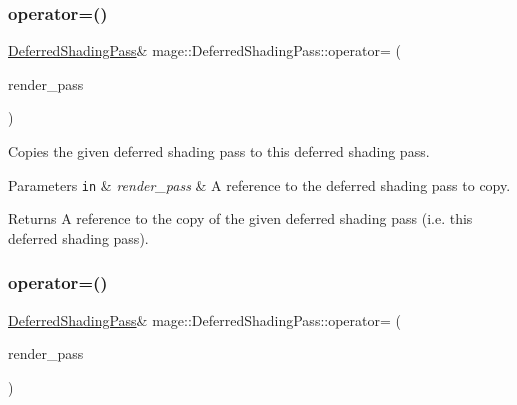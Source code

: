 \subsubsection{\texorpdfstring{operator=()}{operator=()}\hspace{0.1cm}{\footnotesize\ttfamily [1/2]}}
{\footnotesize\ttfamily \hyperlink{classmage_1_1_deferred_shading_pass}{Deferred\+Shading\+Pass}\& mage\+::\+Deferred\+Shading\+Pass\+::operator= (\begin{DoxyParamCaption}\item[{const \hyperlink{classmage_1_1_deferred_shading_pass}{Deferred\+Shading\+Pass} \&}]{render\+\_\+pass }\end{DoxyParamCaption})\hspace{0.3cm}{\ttfamily [delete]}}

Copies the given deferred shading pass to this deferred shading pass.


\begin{DoxyParams}[1]{Parameters}
\mbox{\tt in}  & {\em render\+\_\+pass} & A reference to the deferred shading pass to copy. \\
\hline
\end{DoxyParams}
\begin{DoxyReturn}{Returns}
A reference to the copy of the given deferred shading pass (i.\+e. this deferred shading pass). 
\end{DoxyReturn}
\hypertarget{classmage_1_1_deferred_shading_pass_a1a3ee174f93d538bd1c8c6a37f1e94f7}{}\label{classmage_1_1_deferred_shading_pass_a1a3ee174f93d538bd1c8c6a37f1e94f7} 
\subsubsection{\texorpdfstring{operator=()}{operator=()}\hspace{0.1cm}{\footnotesize\ttfamily [2/2]}}
{\footnotesize\ttfamily \hyperlink{classmage_1_1_deferred_shading_pass}{Deferred\+Shading\+Pass}\& mage\+::\+Deferred\+Shading\+Pass\+::operator= (\begin{DoxyParamCaption}\item[{\hyperlink{classmage_1_1_deferred_shading_pass}{Deferred\+Shading\+Pass} \&\&}]{render\+\_\+pass }\end{DoxyParamCaption})\hspace{0.3cm}{\ttfamily [delete]}}

